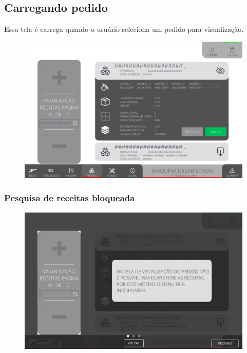 \newpage
\thispagestyle{fancy}
\vspace*{40 pt}
\subsection{Carregando pedido} \label{sec:telaCarregandoPedido}
Essa tela é carrega quando o usuário seleciona um pedido para visualização.
\vspace*{\fill}
\begin{figure}[h]
    \centering
    \includegraphics[width=480 px,height=300 px]{src/imagesICV/09-request/visualization/Tela-Principal-2.png}
\end{figure}
\vspace*{\fill}

\newpage
\thispagestyle{fancy}
\vspace*{40 pt}
\subsubsection{\small{Pesquisa de receitas bloqueada}} \label{sec:telaCarregandoPedidoPesquisaReceitasBloqueada}
\vspace*{\fill}
\begin{figure}[h]
    \centering
    \includegraphics[width=576 px,height=360 px]{src/imagesICV/09-request/visualization/e-4.png}
\end{figure}
\vspace*{\fill}

